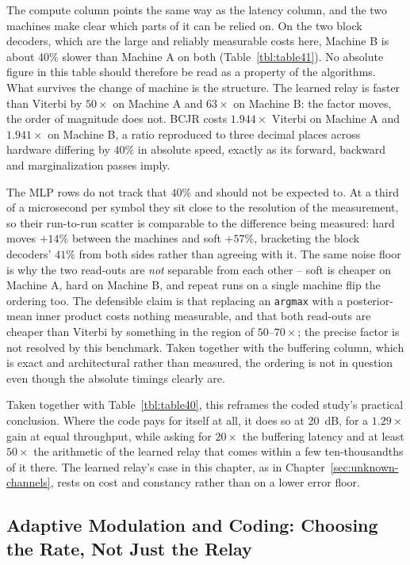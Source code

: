 The compute column points the same way as the latency column, and the two machines make clear which parts of it can be relied on. On the two block decoders, which are the large and reliably measurable costs here, Machine B is about $40\%$ slower than Machine A on both (Table~\ref{tbl:table41}). No absolute figure in this table should therefore be read as a property of the algorithms. What survives the change of machine is the structure. The learned relay is faster than Viterbi by $50\times$ on Machine A and $63\times$ on Machine B: the factor moves, the order of magnitude does not. BCJR costs $1.944\times$ Viterbi on Machine A and $1.941\times$ on Machine B, a ratio reproduced to three decimal places across hardware differing by $40\%$ in absolute speed, exactly as its forward, backward and marginalization passes imply.

The MLP rows do not track that $40\%$ and should not be expected to. At a third of a microsecond per symbol they sit close to the resolution of the measurement, so their run-to-run scatter is comparable to the difference being measured: hard moves $+14\%$ between the machines and soft $+57\%$, bracketing the block decoders' $41\%$ from both sides rather than agreeing with it. The same noise floor is why the two read-outs are \emph{not} separable from each other -- soft is cheaper on Machine A, hard on Machine B, and repeat runs on a single machine flip the ordering too. The defensible claim is that replacing an \texttt{argmax} with a posterior-mean inner product costs nothing measurable, and that both read-outs are cheaper than Viterbi by something in the region of $50$--$70\times$; the precise factor is not resolved by this benchmark. Taken together with the buffering column, which is exact and architectural rather than measured, the ordering is not in question even though the absolute timings clearly are.

Taken together with Table~\ref{tbl:table40}, this reframes the coded study's practical conclusion. Where the code pays for itself at all, it does so at 20~dB, for a $1.29\times$ gain at equal throughput, while asking for $20\times$ the buffering latency and at least $50\times$ the arithmetic of the learned relay that comes within a few ten-thousandths of it there. The learned relay's case in this chapter, as in Chapter~\ref{sec:unknown-channels}, rests on cost and constancy rather than on a lower error floor.

\subsection{Adaptive Modulation and Coding: Choosing the Rate, Not Just the Relay}\label{sec:coded-rate-adaptation}

